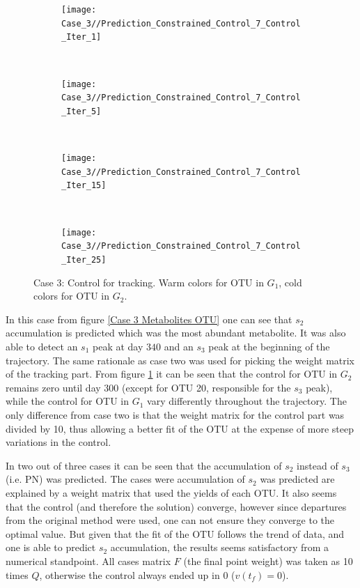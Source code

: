 \documentclass[3p,times]{elsarticle}
\begin{document}
\clearpage
\begin{figure}
	\centering
	\begin{subfigure}[b]{0.32\textheight}
		\texttt{[image: Case\_3//Prediction\_Constrained\_Control\_7\_Control\_Iter\_1]}
	\end{subfigure}
	~
	\begin{subfigure}[b]{0.32\textheight}
		\texttt{[image: Case\_3//Prediction\_Constrained\_Control\_7\_Control\_Iter\_5]}
	\end{subfigure}
	~
	\begin{subfigure}[b]{0.32\textheight}
		\texttt{[image: Case\_3//Prediction\_Constrained\_Control\_7\_Control\_Iter\_15]}
	\end{subfigure}
	~
	\begin{subfigure}[b]{0.32\textheight}
	\texttt{[image: Case\_3//Prediction\_Constrained\_Control\_7\_Control\_Iter\_25]}
	\end{subfigure}
	\caption{Case 3: Control for tracking. Warm colors for OTU in $G_1$, cold colors for OTU in $G_2$.}
	\label{Case 3 Control}
\end{figure}  

In this case from figure \ref{Case 3 Metabolites OTU} one can see that $s_2$ accumulation is predicted which was the most abundant metabolite. It was also able to detect an $s_1$ peak at day $340$ and an $s_3$ peak at the beginning of the trajectory.  The same rationale as case two was used for picking the weight matrix of the tracking part. From figure \ref{Case 3 Control} it can be seen that the control for OTU in $G_2$ remains zero until day 300 (except for OTU 20, responsible for the $s_3$ peak), while the control for OTU in $G_1$ vary differently throughout the trajectory. The only difference from case two is that the weight matrix for the control part was divided by 10, thus allowing a better fit of the OTU at the expense of more steep variations in the control.




\clearpage
In two out of three cases it can be seen that the accumulation of $s_2$ instead of $s_3$ (i.e. PN) was predicted. The cases were accumulation of $s_2$ was predicted are explained by a weight matrix  that used the yields of each OTU. It also seems that the control (and therefore the solution) converge, however since departures from the original method were used, one can not ensure they converge to the optimal value. But given that the fit of the OTU follows the trend of data, and one is able to predict $s_2$ accumulation, the results seems satisfactory from a numerical standpoint. All cases matrix $F$ (the final point weight) was taken as 10 times $Q$, otherwise the control always ended up in $0$ ($v(t_f) = 0$).
\end{document}
